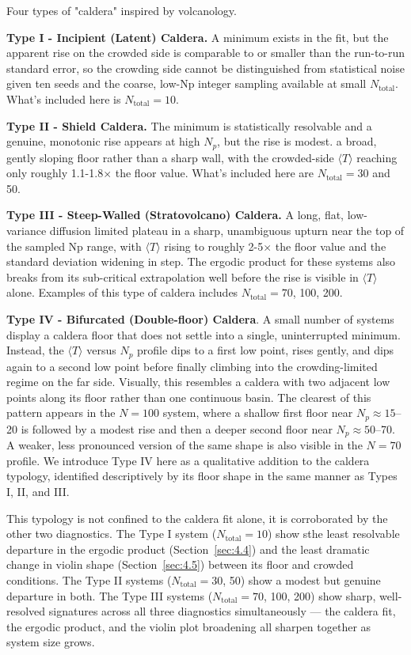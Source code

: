 Four types of "caldera" inspired by volcanology.

\textbf{Type I - Incipient (Latent) Caldera.} A minimum exists in the fit, but the apparent rise on the crowded side is comparable to or smaller than the run-to-run standard error, so the crowding side cannot be distinguished from statistical noise given ten seeds and the coarse, low-Np integer sampling available at small $N_\text{total}$. What's included here is $N_\text{total} = 10$.

\textbf{Type II - Shield Caldera.} The minimum is statistically resolvable and a genuine, monotonic rise appears at high $N_p$, but the rise is modest. a broad, gently sloping floor rather than a sharp wall, with the crowded-side $\langle T \rangle$ reaching only roughly 1.1-1.8$\times$ the floor value. What's included here are $N_\text{total} = 30$ and 50.

\textbf{Type III - Steep-Walled (Stratovolcano) Caldera.} A long, flat, low-variance diffusion limited plateau in a sharp, unambiguous upturn near the top of the sampled Np range, with $\langle T \rangle$ rising to roughly 2-5$\times$ the floor value and the standard deviation widening in step. The ergodic product for these systems also breaks from its sub-critical extrapolation well before the rise is visible in $\langle T \rangle$ alone. Examples of this type of caldera includes $N_\text{total} = 70$, 100, 200.

\textbf{Type IV - Bifurcated (Double-floor) Caldera}. A small number of systems display a caldera floor that does not settle into a single, uninterrupted minimum. Instead, the $\langle T \rangle$ versus $N_p$ profile dips to a first low point, rises gently, and dips again to a second low point before finally climbing into the crowding-limited regime on the far side. Visually, this resembles a caldera with two adjacent low points along its floor rather than one continuous basin. The clearest of this pattern appears in the $N = 100$ system, where a shallow first floor near $N_p\approx 15$--20 is followed by a modest rise and then a deeper second floor near $N_p \approx 50$--70. A weaker, less pronounced version of the same shape is also visible in the $N=70$ profile. We introduce Type IV here as a qualitative addition to the caldera typology, identified descriptively by its floor shape in the same manner as Types I, II, and III.

This typology is not confined to the caldera fit alone, it is corroborated by the other two diagnostics. The Type I system ($N_\text{total} = 10$) show sthe least resolvable departure in the ergodic product (Section~\ref{sec:4.4}) and the least dramatic change in violin shape (Section~\ref{sec:4.5}) between its floor and crowded conditions. The Type II systems ($N_\text{total} = 30$, 50) show a modest but genuine departure in both. The Type III systems ($N_\text{total} = 70$, 100, 200) show sharp, well-resolved signatures across all three diagnostics simultaneously --- the caldera fit, the ergodic product, and the violin plot broadening all sharpen together as system size grows.

